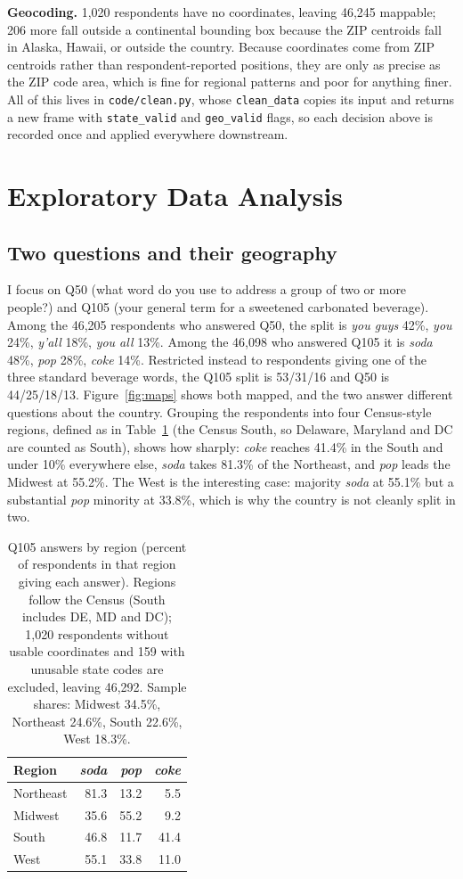 \documentclass[10pt,letterpaper]{article}
\begin{document}
\textbf{Geocoding.} 1,020 respondents have no coordinates, leaving 46,245
mappable; 206 more fall outside a continental bounding box because the ZIP
centroids fall in Alaska, Hawaii, or outside the country. Because coordinates
come from ZIP centroids rather than respondent-reported positions, they are
only as precise as the ZIP code area, which is fine for regional patterns and
poor for anything finer. All of this lives in \texttt{code/clean.py}, whose
\texttt{clean\_data} copies its input and returns a new frame with
\texttt{state\_valid} and \texttt{geo\_valid} flags, so each decision above is
recorded once and applied everywhere downstream.

\section{Exploratory Data Analysis}\label{data-exploration}

\subsection{Two questions and their geography}

I focus on Q50 (what word do you use to address a group of two or more
people?) and Q105 (your general term for a sweetened carbonated beverage).
Among the 46,205 respondents who answered Q50, the split is \emph{you guys}
42\%, \emph{you} 24\%, \emph{y'all} 18\%, \emph{you all} 13\%. Among the 46,098
who answered Q105 it is \emph{soda} 48\%, \emph{pop} 28\%, \emph{coke} 14\%.
Restricted instead to respondents giving one of the three standard beverage
words, the Q105 split is 53/31/16 and Q50 is 44/25/18/13. Figure~\ref{fig:maps} shows both mapped,
and the two answer different questions about the country. Grouping the
respondents into four Census-style regions, defined as in Table~\ref{tab:regions}
(the Census South, so Delaware, Maryland and DC are counted as South), shows how
sharply: \emph{coke} reaches 41.4\% in the South and under 10\% everywhere
else, \emph{soda} takes 81.3\% of the Northeast, and \emph{pop} leads the
Midwest at 55.2\%. The West is the interesting case: majority \emph{soda} at
55.1\% but a substantial \emph{pop} minority at 33.8\%, which is why the
country is not cleanly split in two.

\begin{table}[h]
\centering
\begin{tabular}{lrrr}
\hline
Region & \emph{soda} & \emph{pop} & \emph{coke} \\
\hline
Northeast & 81.3 & 13.2 & 5.5 \\
Midwest & 35.6 & 55.2 & 9.2 \\
South & 46.8 & 11.7 & 41.4 \\
West & 55.1 & 33.8 & 11.0 \\
\hline
\end{tabular}
\caption{Q105 answers by region (percent of respondents in that region giving
each answer). Regions follow the Census (South includes DE, MD and DC); 1,020
respondents without usable coordinates and 159 with unusable state codes are
excluded, leaving 46,292. Sample shares: Midwest 34.5\%, Northeast 24.6\%,
South 22.6\%, West 18.3\%.}
\label{tab:regions}
\end{table}
\end{document}
